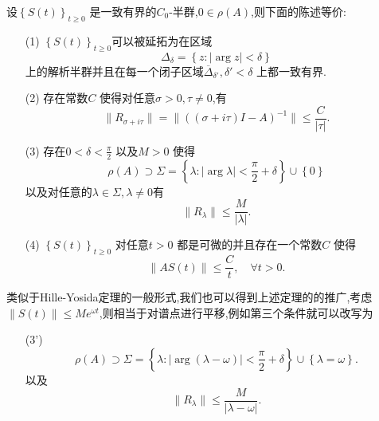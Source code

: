 \begin{frame}[t]
  \begin{theorem}[解析半群的性质]
    设$\left\{S(t)\right\} _{t\ge 0}$ 是一致有界的$C_0$-半群,$0\in \rho (A)$,则下面的陈述等价:
\begin{enumerate}
  \item [(1)]$\left\{S(t)\right\} _{t\ge 0}$可以被延拓为在区域
    \[
    \Delta_{\delta}=\left\{z:|\arg z|<\delta\right\} 
    \] 
    上的解析半群并且在每一个闭子区域$\overline{\Delta}_{\delta'},\delta'<\delta$ 上都一致有界.
  \item [(2)] 存在常数$C$ 使得对任意$\sigma>0,\tau \neq 0$,有
    \begin{equation}
      \|R_{\sigma+i\tau }\|=\|(\left( \sigma+i\tau  \right) I-A)^{-1}\|\le \frac{C}{|\tau |}.
    \end{equation}
  \item [(3)] 存在$0<\delta<\frac{\pi}{2}$ 以及$M>0$ 使得
    \begin{equation}
      \rho(A)\supset \Sigma = \left\{\lambda: |\arg \lambda|<\frac{\pi}{2}+\delta\right\} \cup \left\{0\right\} 
    \end{equation}
    以及对任意的$\lambda \in \Sigma,\lambda\neq 0$有
    \begin{equation}
      \|R_{\lambda}\|\le \frac{M}{|\lambda|}.
    \end{equation}
\end{enumerate}
  \end{theorem}
\end{frame}

\begin{frame}[t]
  \begin{block}{}
    \begin{enumerate}
      \item [(4)] $\left\{S(t)\right\} _{t\ge 0}$ 对任意$t>0$ 都是可微的并且存在一个常数$C$ 使得
	\begin{equation}
	  \|AS(t)\|\le \frac{C}{t},\quad \forall t>0.
	\end{equation}
    \end{enumerate}
  \end{block}
  类似于Hille-Yosida定理的一般形式,我们也可以得到上述定理的的推广,考虑$\|S(t)\|\le Me^{\omega t}$,则相当于对谱点进行平移,例如第三个条件就可以改写为
  \begin{block}{}
    \begin{enumerate}
      \item [(3')] 
	\begin{equation}
	  \rho(A)\supset \Sigma =\left\{\lambda:|\arg \left( \lambda-\omega \right)|<\frac{\pi}{2}+\delta \right\}\cup \left\{\lambda=\omega\right\}.
	\end{equation}
	以及
	\begin{equation}
	  \|R_\lambda\|\le \frac{M}{|\lambda-\omega|}.
	\end{equation}
    \end{enumerate}
  \end{block}
\end{frame}
